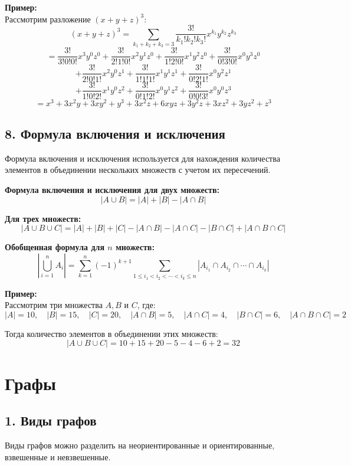 \documentclass{article}
\begin{document}
\textbf{Пример:} \\
Рассмотрим разложение \((x + y + z)^3\):
\[
(x + y + z)^3 = \sum_{k_1 + k_2 + k_3 = 3} \frac{3!}{k_1! k_2! k_3!} x^{k_1} y^{k_2} z^{k_3}
\]
\[
= \frac{3!}{3! 0! 0!} x^3 y^0 z^0 + \frac{3!}{2! 1! 0!} x^2 y^1 z^0 + \frac{3!}{1! 2! 0!} x^1 y^2 z^0 + \frac{3!}{0! 3! 0!} x^0 y^3 z^0 
\]
\[
+ \frac{3!}{2! 0! 1!} x^2 y^0 z^1 + \frac{3!}{1! 1! 1!} x^1 y^1 z^1 + \frac{3!}{0! 2! 1!} x^0 y^2 z^1 
\]
\[
+ \frac{3!}{1! 0! 2!} x^1 y^0 z^2 + \frac{3!}{0! 1! 2!} x^0 y^1 z^2 + \frac{3!}{0! 0! 3!} x^0 y^0 z^3
\]
\[
= x^3 + 3x^2 y + 3x y^2 + y^3 + 3x^2 z + 6xy z + 3y^2 z + 3xz^2 + 3y z^2 + z^3
\]
\pagebreak

\subsection*{8. Формула включения и исключения}

Формула включения и исключения используется для нахождения количества элементов в объединении нескольких множеств с учетом их пересечений.

\textbf{Формула включения и исключения для двух множеств:}
\[
|A \cup B| = |A| + |B| - |A \cap B|
\]

\textbf{Для трех множеств:}
\[
|A \cup B \cup C| = |A| + |B| + |C| - |A \cap B| - |A \cap C| - |B \cap C| + |A \cap B \cap C|
\]

\textbf{Обобщенная формула для \( n \) множеств:}
\[
\left| \bigcup_{i=1}^{n} A_i \right| = \sum_{k=1}^{n} (-1)^{k+1} \sum_{1 \leq i_1 < i_2 < \cdots < i_k \leq n} \left| A_{i_1} \cap A_{i_2} \cap \cdots \cap A_{i_k} \right|
\]

\textbf{Пример:} \\
Рассмотрим три множества \( A, B \) и \( C \), где:
\[
|A| = 10, \quad |B| = 15, \quad |C| = 20, \quad |A \cap B| = 5, \quad |A \cap C| = 4, \quad |B \cap C| = 6, \quad |A \cap B \cap C| = 2
\]

Тогда количество элементов в объединении этих множеств:
\[
|A \cup B \cup C| = 10 + 15 + 20 - 5 - 4 - 6 + 2 = 32
\]
\pagebreak


\section*{Графы}  
\subsection*{1. Виды графов}


Виды графов можно разделить на неориентированные и ориентированные, взвешенные и невзвешенные.
\end{document}
